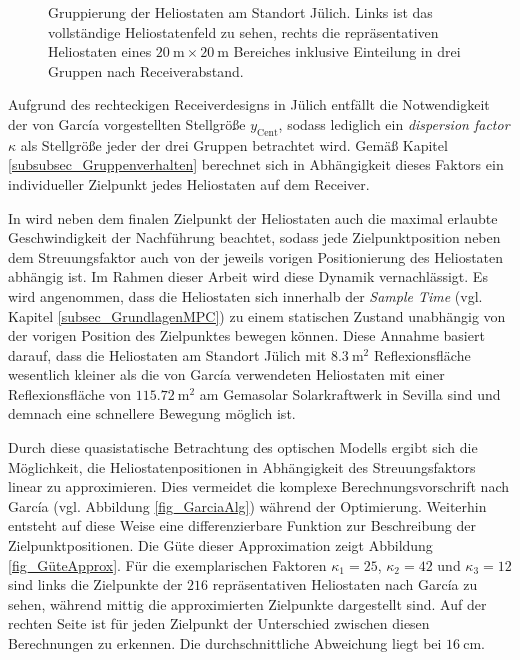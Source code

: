 \begin{figure}[p]
    \centering
    \setlength{\fboxsep}{5pt}
    \setlength{\fboxrule}{1pt}
    \caption[Gruppierung der Heliostaten am Standort Jülich. Links ist das vollständige Heliostatenfeld zu sehen, rechts die repräsentativen Heliostaten eines $\SI{20}{\metre} \times \SI{20}{\metre}$ Bereiches inklusive Einteilung in drei Gruppen nach Receiverabstand.]{Gruppierung der Heliostaten am Standort Jülich. Links ist das vollständige Heliostatenfeld zu sehen, rechts die repräsentativen Heliostaten eines $\SI{20}{\metre} \times \SI{20}{\metre}$ Bereiches inklusive Einteilung in drei Gruppen nach Receiverabstand.}
    \label{fig_HeliostatenfeldGruppen}
\end{figure}

Aufgrund des rechteckigen Receiverdesigns in Jülich entfällt die Notwendigkeit der von García vorgestellten Stellgröße $y_{\mathrm{Cent}}$, sodass lediglich ein \textit{dispersion factor} $\kappa$ als Stellgröße jeder der drei Gruppen betrachtet wird.
Gemäß Kapitel \ref{subsubsec_Gruppenverhalten} berechnet sich in Abhängigkeit dieses Faktors ein individueller Zielpunkt jedes Heliostaten auf dem Receiver.

In \cite{Garcia2} wird neben dem finalen Zielpunkt der Heliostaten auch die maximal erlaubte Geschwindigkeit der Nachführung beachtet, sodass jede Zielpunktposition neben dem Streuungsfaktor auch von der jeweils vorigen Positionierung des Heliostaten abhängig ist.
Im Rahmen dieser Arbeit wird diese Dynamik vernachlässigt.
Es wird angenommen, dass die Heliostaten sich innerhalb der \textit{Sample Time} (vgl. Kapitel \ref{subsec_GrundlagenMPC}) zu einem statischen Zustand unabhängig von der vorigen Position des Zielpunktes bewegen können.
Diese Annahme basiert darauf, dass die Heliostaten am Standort Jülich mit $\SI{8.3}{\metre\squared}$ \cite[S.13]{DissBelhomme} Reflexionsfläche wesentlich kleiner als die von García verwendeten Heliostaten mit einer Reflexionsfläche von $\SI{115.72}{\metre\squared}$ \cite[S.386]{Wang} am Gemasolar Solarkraftwerk in Sevilla sind und demnach eine schnellere Bewegung möglich ist.

Durch diese quasistatische Betrachtung des optischen Modells ergibt sich die Möglichkeit, die Heliostatenpositionen in Abhängigkeit des Streuungsfaktors linear zu approximieren.
Dies vermeidet die komplexe Berechnungsvorschrift nach García (vgl. Abbildung \ref{fig_GarciaAlg}) während der Optimierung.
Weiterhin entsteht auf diese Weise eine differenzierbare Funktion zur Beschreibung der Zielpunktpositionen.
Die Güte dieser Approximation zeigt Abbildung \ref{fig_GüteApprox}.
Für die exemplarischen Faktoren $\kappa_1 = 25$, $\kappa_2 = 42$ und $\kappa_3 = 12$ sind links die Zielpunkte der $216$ repräsentativen Heliostaten nach García zu sehen, während mittig die approximierten Zielpunkte dargestellt sind.
Auf der rechten Seite ist für jeden Zielpunkt der Unterschied zwischen diesen Berechnungen zu erkennen.
Die durchschnittliche Abweichung liegt bei $\SI{16}{\centi\metre}$.

